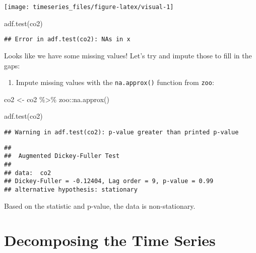 \documentclass[
]{book}
\newenvironment{Shaded}{\begin{snugshade}}{\end{snugshade}}
\newcommand{\FunctionTok}[1]{\textcolor[rgb]{0.00,0.00,0.00}{#1}}
\newcommand{\NormalTok}[1]{#1}
\newcommand{\OtherTok}[1]{\textcolor[rgb]{0.56,0.35,0.01}{#1}}
\newcommand{\SpecialCharTok}[1]{\textcolor[rgb]{0.00,0.00,0.00}{#1}}
\providecommand{\tightlist}{%
  \setlength{\itemsep}{0pt}\setlength{\parskip}{0pt}}
\begin{document}
\begin{center}\texttt{[image: timeseries\_files/figure-latex/visual-1]} \end{center}

\begin{Shaded}
\begin{Highlighting}[]
\FunctionTok{adf.test}\NormalTok{(co2)}
\end{Highlighting}
\end{Shaded}

\begin{verbatim}
## Error in adf.test(co2): NAs in x
\end{verbatim}

Looks like we have some missing values! Let's try and impute those to fill in the gaps:

\begin{enumerate}
\def\labelenumi{\arabic{enumi}.}
\setcounter{enumi}{1}
\tightlist
\item
  Impute missing values with the \texttt{na.approx()} function from \texttt{zoo}:
\end{enumerate}

\begin{Shaded}
\begin{Highlighting}[]
\NormalTok{co2 }\OtherTok{\textless{}{-}}\NormalTok{ co2 }\SpecialCharTok{\%\textgreater{}\%} 
\NormalTok{  zoo}\SpecialCharTok{::}\FunctionTok{na.approx}\NormalTok{()}

\FunctionTok{adf.test}\NormalTok{(co2)}
\end{Highlighting}
\end{Shaded}

\begin{verbatim}
## Warning in adf.test(co2): p-value greater than printed p-value
\end{verbatim}

\begin{verbatim}
## 
##  Augmented Dickey-Fuller Test
## 
## data:  co2
## Dickey-Fuller = -0.12404, Lag order = 9, p-value = 0.99
## alternative hypothesis: stationary
\end{verbatim}

Based on the statistic and p-value, the data is non-stationary.

\hypertarget{decomposing-the-time-series}{%
\section{Decomposing the Time Series}\label{decomposing-the-time-series}}
\end{document}
